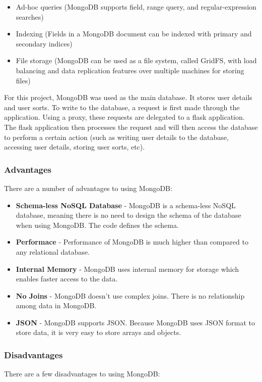 \begin{itemize}
    \item Ad-hoc queries (MongoDB supports field, range query, and
    regular-expression searches)
    \item Indexing (Fields in a MongoDB document can be indexed with primary and
    secondary indices)
    \item File storage (MongoDB can be used as a file system, called GridFS,
    with load balancing and data replication features over multiple machines for
    storing files)  
\end{itemize}

For this project, MongoDB was used as the main database. It stores user details
and user sorts. To write to the database, a request is first made through the 
application. Using a proxy, these requests are delegated to a flask application.
The flask application then processes the request and will then access the 
database to perform a certain action (such as writing user details to the 
database, accessing user details, storing user sorts, etc). 

\subsubsection{Advantages}
There are a number of advantages to using MongoDB:

\begin{itemize}
    \item \textbf{Schema-less NoSQL Database} - MongoDB is a schema-less NoSQL
    database, meaning there is no need to design the schema of the database when
    using MongoDB. The code defines the schema.
    \item \textbf{Performace} - Performance of MongoDB is much higher than
    compared to any relational database.
    \item \textbf{Internal Memory} - MongoDB uses internal memory for storage
    which enables faster access to the data.
    \item \textbf{No Joins} - MongoDB doesn't use complex joins. There is no
    relationship among data in MongoDB.
    \item \textbf{JSON} - MongoDB supports JSON. Because MongoDB uses JSON
    format to store data, it is very easy to store arrays and objects.
\end{itemize}

\subsubsection{Disadvantages}
There are a few disadvantages to using MongoDB:

